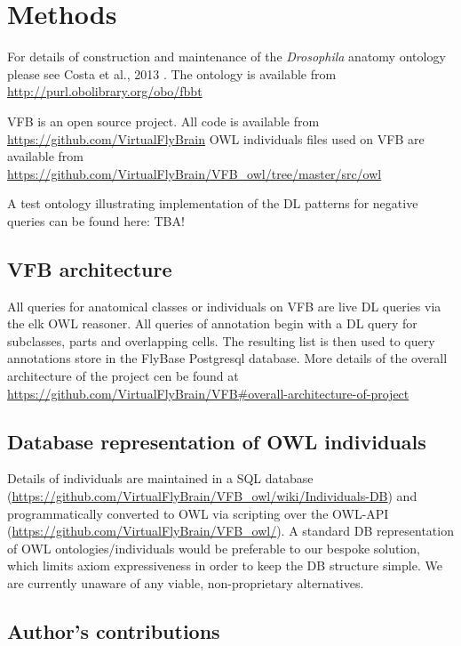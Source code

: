 \documentclass[runningheads,a4paper]{llncs}
\begin{document}
\section{Methods}

For details of construction and maintenance of the \textit{Drosophila}
anatomy ontology please see Costa et al., 2013 \cite{Costa2013}. The
ontology is available from \url{http://purl.obolibrary.org/obo/fbbt}

VFB is an open source project.  All code is available from \url{https://github.com/VirtualFlyBrain}
OWL individuals files used on VFB are available from 
\url{https://github.com/VirtualFlyBrain/VFB_owl/tree/master/src/owl} %

A test ontology illustrating implementation of the DL patterns for
negative queries can be found here: TBA!

\subsection{VFB architecture}

All queries for anatomical classes or individuals on VFB are live DL
queries via the elk OWL reasoner.  All queries of annotation begin
with a DL query for subclasses, parts and overlapping cells.  The
resulting list is then used to query annotations store in the FlyBase
Postgresql database.  More details of the overall architecture of the
project cen be found at
\url{https://github.com/VirtualFlyBrain/VFB#overall-architecture-of-project}


\subsection{Database representation of OWL individuals}
 
Details of individuals are maintained in a SQL database
(\url{https://github.com/VirtualFlyBrain/VFB_owl/wiki/Individuals-DB})
and programmatically converted to OWL via scripting over the OWL-API
(\url{https://github.com/VirtualFlyBrain/VFB_owl/}).  A standard DB
representation of OWL ontologies/individuals would be preferable to
our bespoke solution, which limits axiom expressiveness in order to
keep the DB structure simple.  We are currently unaware of any viable,
non-proprietary alternatives.

\subsection*{Author's contributions}
\end{document}
